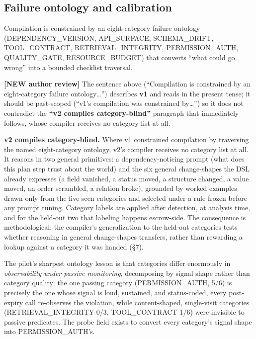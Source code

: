 \documentclass[acmsmall,screen,review,anonymous]{acmart}
\renewenvironment{leftbar}{%
  \def\FrameCommand{\hspace{2pt}{\color{lbcol}\vrule width 1.5pt}\hspace{8pt}}%
  \MakeFramed{\advance\hsize-\width \FrameRestore}\small}%
  {\endMakeFramed}
\begin{document}
\subsection{Failure ontology and calibration}
Compilation is constrained by an eight-category failure ontology (DEPENDENCY\_VERSION, API\_SURFACE, SCHEMA\_DRIFT, TOOL\_CONTRACT, RETRIEVAL\_INTEGRITY, PERMISSION\_AUTH, QUALITY\_GATE, RESOURCE\_BUDGET) that converts ``what could go wrong'' into a bounded checklist traversal.

\begin{leftbar}
\textbf{[NEW \textperiodcentered{} author review]} The sentence above (``Compilation is constrained by an eight-category failure ontology\dots{}'') describes \textbf{v1} and reads in the present tense; it should be past-scoped (``v1's compilation was constrained by\dots{}'') so it does not contradict the \textbf{``v2 compiles category-blind''} paragraph that immediately follows, whose compiler receives no category list at all.

\end{leftbar}
\textbf{v2 compiles category-blind.} Where v1 constrained compilation by traversing the named eight-category ontology, v2's compiler receives no category list at all. It reasons in two general primitives: a dependency-noticing prompt (what does this plan step trust about the world) and the six general change-shapes the DSL already expresses (a field vanished, a status moved, a structure changed, a value moved, an order scrambled, a relation broke), grounded by worked examples drawn only from the five seen categories and selected under a rule frozen before any prompt tuning. Category labels are applied after detection, at analysis time, and for the held-out two that labeling happens escrow-side. The consequence is methodological: the compiler's generalization to the held-out categories tests whether reasoning in general change-shapes transfers, rather than rewarding a lookup against a category it was handed (\S7).

The pilot's sharpest ontology lesson is that categories differ enormously in \emph{observability under passive monitoring}, decomposing by signal shape rather than category quality: the one passing category (PERMISSION\_AUTH, 5/6) is precisely the one whose signal is loud, sustained, and status-coded, every post-expiry call re-observes the violation, while content-shaped, single-visit categories (RETRIEVAL\_INTEGRITY 0/3, TOOL\_CONTRACT 1/6) were invisible to passive predicates. The probe field exists to convert every category's signal shape into PERMISSION\_AUTH's.
\end{document}
